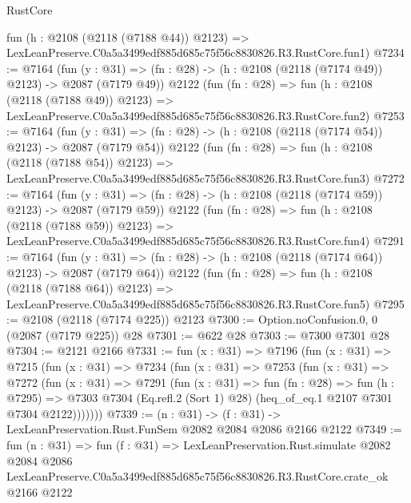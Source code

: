 \begin{lexlean}{RustCore}
\begin{coremodule}
    fun (h : @2108 (@2118 (@7188 @44)) @2123) =>
    LexLeanPreserve.C0a5a3499edf885d685c75f56c8830826.R3.RustCore.fun1)
@7234 := @7164
    (fun (y : @31) => (fn : @28) -> (h : @2108 (@2118 (@7174 @49)) @2123) -> @2087 (@7179 @49))
    @2122
    (fun (fn : @28) =>
    fun (h : @2108 (@2118 (@7188 @49)) @2123) =>
    LexLeanPreserve.C0a5a3499edf885d685c75f56c8830826.R3.RustCore.fun2)
@7253 := @7164
    (fun (y : @31) => (fn : @28) -> (h : @2108 (@2118 (@7174 @54)) @2123) -> @2087 (@7179 @54))
    @2122
    (fun (fn : @28) =>
    fun (h : @2108 (@2118 (@7188 @54)) @2123) =>
    LexLeanPreserve.C0a5a3499edf885d685c75f56c8830826.R3.RustCore.fun3)
@7272 := @7164
    (fun (y : @31) => (fn : @28) -> (h : @2108 (@2118 (@7174 @59)) @2123) -> @2087 (@7179 @59))
    @2122
    (fun (fn : @28) =>
    fun (h : @2108 (@2118 (@7188 @59)) @2123) =>
    LexLeanPreserve.C0a5a3499edf885d685c75f56c8830826.R3.RustCore.fun4)
@7291 := @7164
    (fun (y : @31) => (fn : @28) -> (h : @2108 (@2118 (@7174 @64)) @2123) -> @2087 (@7179 @64))
    @2122
    (fun (fn : @28) =>
    fun (h : @2108 (@2118 (@7188 @64)) @2123) =>
    LexLeanPreserve.C0a5a3499edf885d685c75f56c8830826.R3.RustCore.fun5)
@7295 := @2108 (@2118 (@7174 @225)) @2123
@7300 := Option.noConfusion.{0, 0} (@2087 (@7179 @225)) @28
@7301 := @622 @28
@7303 := @7300 @7301 @28
@7304 := @2121 @2166
@7331 := fun (x : @31) =>
  @7196
    (fun (x : @31) =>
    @7215
      (fun (x : @31) =>
      @7234
        (fun (x : @31) =>
        @7253
          (fun (x : @31) =>
          @7272
            (fun (x : @31) =>
            @7291
              (fun (x : @31) =>
              fun (fn : @28) =>
              fun (h : @7295) =>
              @7303 @7304 (Eq.refl.{2} (Sort 1) @28) (heq_of_eq.{1} @2107 @7301 @7304 @2122)))))))
@7339 := (n : @31) -> (f : @31) -> LexLeanPreservation.Rust.FunSem @2082 @2084 @2086 @2166 @2122
@7349 := fun (n : @31) =>
  fun (f : @31) =>
  LexLeanPreservation.Rust.simulate
    @2082
    @2084
    @2086
    LexLeanPreserve.C0a5a3499edf885d685c75f56c8830826.R3.RustCore.crate_ok
    @2166
    @2122
\end{coremodule}
\end{lexlean}
